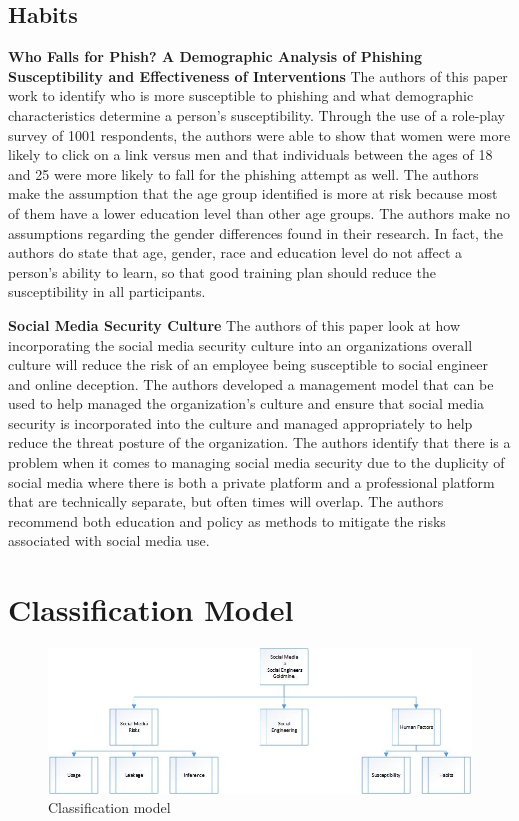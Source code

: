 \documentclass[conference]{IEEEtran}
\begin{document}
\subsection{Habits}

\textbf {Who Falls for Phish? A Demographic Analysis of Phishing Susceptibility and Effectiveness of Interventions}
The authors of this paper work to identify who is more susceptible to phishing and what demographic characteristics determine a person’s susceptibility. Through the use of a role-play survey of 1001 respondents, the authors were able to show that women were more likely to click on a link versus men and that individuals between the ages of 18 and 25 were more likely to fall for the phishing attempt as well. The authors make the assumption that the age group identified is more at risk because most of them have a lower education level than other age groups.  The authors make no assumptions regarding the gender differences found in their research. In fact, the authors do state that age, gender, race and education level do not affect a person’s ability to learn, so that good training plan should reduce the susceptibility in all participants. 

\textbf {Social Media Security Culture}
The authors of this paper look at how incorporating the social media security culture into an organizations overall culture will reduce the risk of an employee being susceptible to social engineer and online deception.  The authors developed a management model that can be used to help managed the organization’s culture and ensure that social media security is incorporated into the culture and managed appropriately to help reduce the threat posture of the organization. The authors identify that there is a problem when it comes to managing social media security due to the duplicity of social media where there is both a private platform and a professional platform that are technically separate, but often times will overlap.  The authors recommend both education and policy as methods to mitigate the risks associated with social media use. 

\section{Classification Model}

\begin{figure}[htbp]
\centerline{\includegraphics[scale= .25]{classification.jpg}}
\caption{Classification model }
\label{fig}
\end{figure}


\nocite{*}


\end{document}
